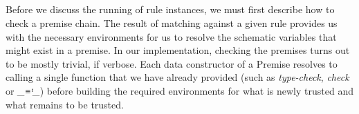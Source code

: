\begin{code}%
\>[0]%
\>[7]\AgdaSymbol{:}%
\>[10]%
\>[29]\<%
\\
%
\>[10]\AgdaSpace{}%
%
\>[29]\<%
\\
%
\>[10]\AgdaSymbol{(}\AgdaSpace{}%
\AgdaSymbol{:}\AgdaSpace{}%
\AgdaSpace{}%
\AgdaSymbol{)}%
\>[29]\<%
\\
%
\>[10]\AgdaSymbol{(}\AgdaSpace{}%
\AgdaSymbol{:}\AgdaSpace{}%
\AgdaSpace{}%
\AgdaSpace{}%
\AgdaSymbol{)}%
\>[29]\<%
\\
%
\>[10]\AgdaSpace{}%
\<%
\\
\>[0]\<%
\\
\>[0]%
\>[7]\AgdaSymbol{:}%
\>[10]%
\>[29]\<%
\\
%
\>[10]\AgdaSpace{}%
%
\>[29]\<%
\\
%
\>[10]\AgdaSymbol{(}\AgdaSpace{}%
\AgdaSymbol{:}\AgdaSpace{}%
\AgdaSpace{}%
\AgdaSymbol{)}%
\>[29]\<%
\\
%
\>[10]\AgdaSpace{}%
\AgdaSymbol{(}\AgdaSpace{}%
\AgdaSymbol{)}\<%
\end{code}

Before we discuss the running of rule instances, we must first describe how
to check a premise chain. The result of matching against a given rule provides
us with the necessary environments for us to resolve the schematic variables
that might exist in a premise. In our implementation, checking the premises
turns out to be mostly trivial, if verbose. Each data constructor of a Premise
resolves to calling a single function that we have already provided (such as 
\emph{type-check}, \emph{check} or \emph{\_≡ᵗ\_}) before building the required
environments for what is newly trusted and what remains to be trusted.


